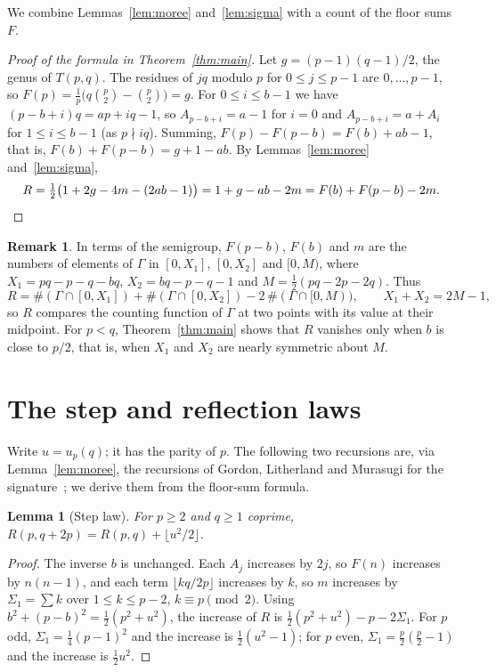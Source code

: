 \documentclass[11pt,reqno]{amsart}
\theoremstyle{plain}
\newtheorem{lemma}[theorem]{Lemma}
\theoremstyle{definition}
\newtheorem{remark}[theorem]{Remark}
\begin{document}
We combine Lemmas~\ref{lem:moree} and~\ref{lem:sigma} with a count of the floor sums $F$.

\begin{proof}[Proof of the formula in Theorem~\ref{thm:main}]
Let $g=(p-1)(q-1)/2$, the genus of $T(p,q)$. The residues of $jq$ modulo $p$ for $0\le j\le p-1$ are
$0,\dots,p-1$, so $F(p)=\frac1p\bigl(q\binom p2-\binom p2\bigr)=g$. For $0\le i\le b-1$ we have
$(p-b+i)q=ap+iq-1$, so $A_{p-b+i}=a-1$ for $i=0$ and $A_{p-b+i}=a+A_i$ for $1\le i\le b-1$ (as
$p\nmid iq$). Summing, $F(p)-F(p-b)=F(b)+ab-1$, that is, $F(b)+F(p-b)=g+1-ab$. By
Lemmas~\ref{lem:moree} and~\ref{lem:sigma},
\[
R=\tfrac12\bigl(1+2g-4m-(2ab-1)\bigr)=1+g-ab-2m=F(b)+F(p-b)-2m .\qedhere
\]
\end{proof}

\begin{remark}\label{rem:semigroup}
In terms of the semigroup, $F(p-b)$, $F(b)$ and $m$ are the numbers of elements of $\Gamma$ in
$[0,X_1]$, $[0,X_2]$ and $[0,M)$, where $X_1=pq-p-q-bq$, $X_2=bq-p-q-1$ and $M=\frac12(pq-2p-2q)$. Thus
\[
R=\#(\Gamma\cap[0,X_1])+\#(\Gamma\cap[0,X_2])-2\,\#(\Gamma\cap[0,M)),\qquad X_1+X_2=2M-1,
\]
so $R$ compares the counting function of $\Gamma$ at two points with its value at their midpoint. For
$p<q$, Theorem~\ref{thm:main} shows that $R$ vanishes only when $b$ is close to $p/2$, that is, when
$X_1$ and $X_2$ are nearly symmetric about $M$.
\end{remark}

\section{The step and reflection laws}\label{sec:laws}

Write $u=u_p(q)$; it has the parity of $p$. The following two recursions are, via
Lemma~\ref{lem:moree}, the recursions of Gordon, Litherland and Murasugi for the
signature~\cite[Thm.~5.2]{GLM}; we derive them from the floor-sum formula.

\begin{lemma}[Step law]\label{lem:step}
For $p\ge2$ and $q\ge1$ coprime, $R(p,q+2p)=R(p,q)+\lfloor u^2/2\rfloor$.
\end{lemma}

\begin{proof}
The inverse $b$ is unchanged. Each $A_j$ increases by $2j$, so $F(n)$ increases by $n(n-1)$, and each
term $\lfloor kq/2p\rfloor$ increases by $k$, so $m$ increases by $\Sigma_1=\sum k$ over
$1\le k\le p-2$, $k\equiv p\pmod2$. Using $b^2+(p-b)^2=\frac12(p^2+u^2)$, the increase of $R$ is
$\frac12(p^2+u^2)-p-2\Sigma_1$. For $p$ odd, $\Sigma_1=\frac14(p-1)^2$ and the increase is
$\frac12(u^2-1)$; for $p$ even, $\Sigma_1=\frac p2(\frac p2-1)$ and the increase is $\frac12u^2$.
\end{proof}
\end{document}
